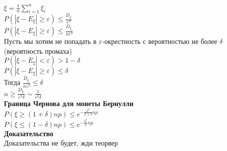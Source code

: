 \documentclass[12pt]{article}
\begin{document}
$\xi = \frac1n \sum_{i=1}^n \xi_i$\\
$P(|\xi-E_\xi| \geq \varepsilon) \leq \frac{D_\xi}{\varepsilon^2}$\\
$P(|\xi-E_\xi| \geq \varepsilon) \leq \frac{D_{\xi_i}}{n\varepsilon^2}$\\
Пусть мы хотим не попадать в $\varepsilon$-окрестность с вероятностью не более $\delta$ (вероятность промаха)\\
$P(|\xi-E_\xi| < \varepsilon) > 1 - \delta$\\
$P(|\xi-E_\xi| \geq \varepsilon) \leq \delta$\\
Тогда $\frac{D_{\xi_i}}{n\varepsilon^2} \leq \delta$\\
$n \geq \frac{D_{\xi_i}}{\varepsilon^2 \delta} \sim \frac1{\varepsilon^2\delta}$\\
\textbf{Граница Чернова для монеты Бернулли}\\
$P(\xi \geq (1+\delta)np) \leq e^{-\frac{\delta^2}{2+\delta}np}$\\
$P(\xi \leq (1-\delta)np) \leq e^{-\frac{\delta^2}2np}$\\
\textbf{Доказательство}\\
Доказательства не будет, жди теорвер\\
\end{document}

